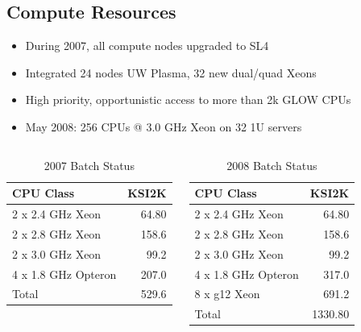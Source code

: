 \documentclass{beamer}
\begin{document}
\subsection{Compute Resources}
\begin{frame}
\begin{itemize}
    \item During 2007, all compute nodes upgraded to SL4
    \item Integrated 24 nodes UW Plasma, 32 new dual/quad Xeons
    \item High priority, opportunistic access to more than 2k GLOW CPUs
    \item May 2008: 256 CPUs @ 3.0 GHz Xeon on 32 1U servers
\end{itemize}
\begin{columns}
\column{2.5in}
\begin{table}
    \begin{tabular}{lr}
        \toprule
        CPU Class           & KSI2K \\
        \midrule
        2 x 2.4 GHz Xeon    & 64.80 \\    %
        2 x 2.8 GHz Xeon    & 158.6 \\    %
        2 x 3.0 GHz Xeon    & 99.2 \\     %
        4 x 1.8 GHz Opteron & 207.0 \\    %
        \midrule
        Total & 529.6 \\
        \bottomrule
    \end{tabular}
    \caption{2007 Batch Status}
    \label{2007_Batch_status}
\end{table}

\column{2.5in}
\begin{table}
    \begin{tabular}{lr}
        \toprule
        CPU Class           & KSI2K \\
        \midrule
        2 x 2.4 GHz Xeon    & 64.80 \\    %
        2 x 2.8 GHz Xeon    & 158.6 \\    %
        2 x 3.0 GHz Xeon    & 99.2 \\     %
        4 x 1.8 GHz Opteron & 317.0 \\    %
        8 x g12 Xeon        & 691.2 \\    %
        \midrule
        Total & 1330.80 \\
        \bottomrule
    \end{tabular}
    \caption{2008 Batch Status}
    \label{2008_Batch_status}
\end{table}
\end{columns}
\end{frame}
\end{document}
